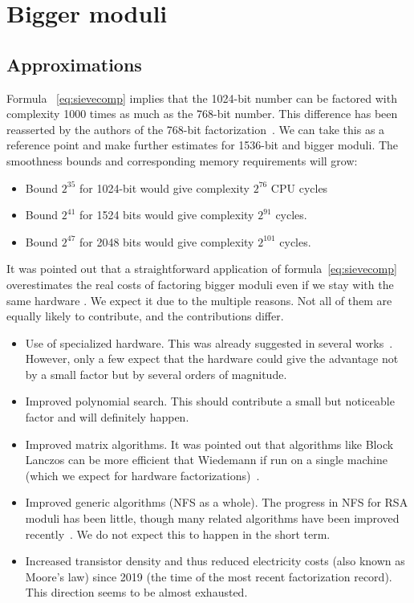 \documentclass[a4paper]{article}
\begin{document}
\section{Bigger moduli}
\subsection{Approximations}\label{sec:approx}
Formula ~\eqref{eq:sievecomp} implies that the 1024-bit number can be factored with complexity 1000 times as much  as the 768-bit number. This difference has been reasserted by the authors of the 768-bit factorization~\cite{DBLP:conf/crypto/KleinjungAFLTBGKMORTZ10}. We can take this as a reference point and make further estimates for 1536-bit and bigger moduli. The smoothness bounds and corresponding memory requirements will grow:
\begin{itemize}
    \item Bound $2^{35}$ for 1024-bit would give  complexity $2^{76}$ CPU cycles
    \item Bound $2^{41}$ for 1524 bits would give complexity $2^{91}$ cycles.
    \item Bound $2^{47}$ for 2048 bits would give complexity $2^{101}$ cycles.
 \end{itemize}
 
It was pointed out that a straightforward application of formula~\eqref{eq:sievecomp} overestimates the real costs of factoring bigger moduli even if we stay with the same hardware \cite{DBLP:conf/eurocrypt/KleinjungDLPS17}. We expect it due to the multiple reasons. Not all of them are equally likely to contribute, and the contributions differ.
\begin{itemize}
    \item Use of specialized hardware. This was already suggested in several works~\cite{bernstein01,DBLP:conf/asiacrypt/LenstraSTT02,shamir2003factoring}. However, only a few expect that the hardware could give the advantage not by a small factor but by several orders of magnitude.
    \item Improved polynomial search. This should contribute a small but noticeable factor and will definitely happen.
    \item Improved matrix algorithms. It was pointed out that algorithms like Block Lanczos can be more efficient that Wiedemann if run on a single machine (which we expect for hardware factorizations)~\cite{thome2016modified}.
    \item Improved generic algorithms (NFS as a whole). The progress in NFS for RSA moduli has been little, though many related algorithms have been improved recently~\cite{DBLP:conf/crypto/0001B16}. We do not expect this to happen in the short term.
    \item Increased transistor density and thus reduced electricity costs (also known as Moore's law) since 2019 (the time of the most recent factorization record). This direction seems to be almost exhausted.
\end{itemize}
 
\end{document}
